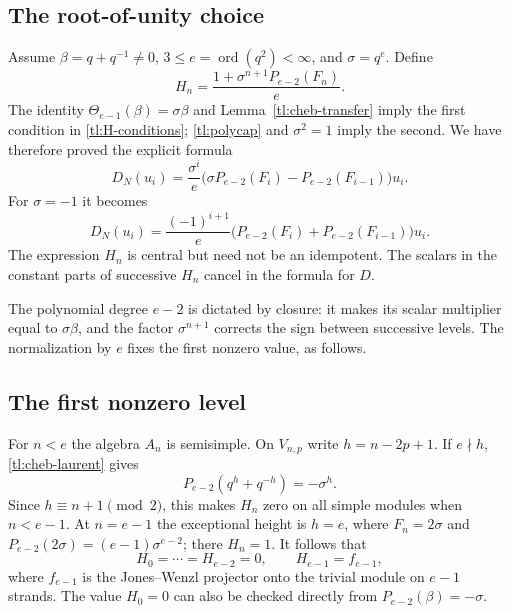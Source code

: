 \documentclass[a4paper,11pt,oneside,reqno]{amsart}
\theoremstyle{definition}
\numberwithin{equation}{section}
\begin{document}
	\subsection{The root-of-unity choice}
	Assume $\beta=q+q^{-1}\ne0$, $3\le e=\operatorname{ord}(q^2)<\infty$,
	and $\sigma=q^e$. Define
	\begin{equation}\label{tl:H-definition}
		\boxed{H_n=\frac{1+\sigma^{n+1}P_{e-2}(F_n)}e.}
	\end{equation}
	The identity $\Theta_{e-1}(\beta)=\sigma\beta$ and
	Lemma~\ref{tl:cheb-transfer} imply the first condition in
	\eqref{tl:H-conditions}; \eqref{tl:polycap} and $\sigma^2=1$
	imply the second.  We have therefore proved the explicit formula
	\begin{equation}\label{tl:D-general}
		\boxed{D_N(u_i)=\frac{\sigma^i}{e}
			\bigl(\sigma P_{e-2}(F_i)-P_{e-2}(F_{i-1})\bigr)u_i.}
	\end{equation}
	For $\sigma=-1$ it becomes
	\begin{equation}\label{tl:D-original}
		D_N(u_i)=\frac{(-1)^{i+1}}e
		\bigl(P_{e-2}(F_i)+P_{e-2}(F_{i-1})\bigr)u_i.
	\end{equation}
	The expression $H_n$ is central but need not be an idempotent.
	The scalars in the constant parts of successive $H_n$ cancel in
	the formula for $D$.
	
	The polynomial degree $e-2$ is dictated by closure: it makes its
	scalar multiplier equal to $\sigma\beta$, and the factor
	$\sigma^{n+1}$ corrects the sign between successive levels.  The
	normalization by $e$ fixes the first nonzero value, as follows.
	
	\subsection{The first nonzero level}
	For $n<e$ the algebra $A_n$ is semisimple.  On $V_{n,p}$ write
	$h=n-2p+1$.  If $e\nmid h$, \eqref{tl:cheb-laurent} gives
	\begin{equation}\label{tl:P-at-height}
		P_{e-2}(q^h+q^{-h})=-\sigma^h.
	\end{equation}
	Since $h\equiv n+1\pmod2$, this makes $H_n$ zero on all simple
	modules when $n<e-1$.  At $n=e-1$ the exceptional height is $h=e$,
	where $F_n=2\sigma$ and
	$P_{e-2}(2\sigma)=(e-1)\sigma^{e-2}$; there $H_n=1$.
	It follows that
	\begin{equation}\label{tl:H-initial}
		H_0=\cdots=H_{e-2}=0,\qquad H_{e-1}=f_{e-1},
	\end{equation}
	where $f_{e-1}$ is the Jones--Wenzl projector onto the trivial module
	on $e-1$ strands.  The value $H_0=0$ can also be checked directly
	from $P_{e-2}(\beta)=-\sigma$.
	
\end{document}
